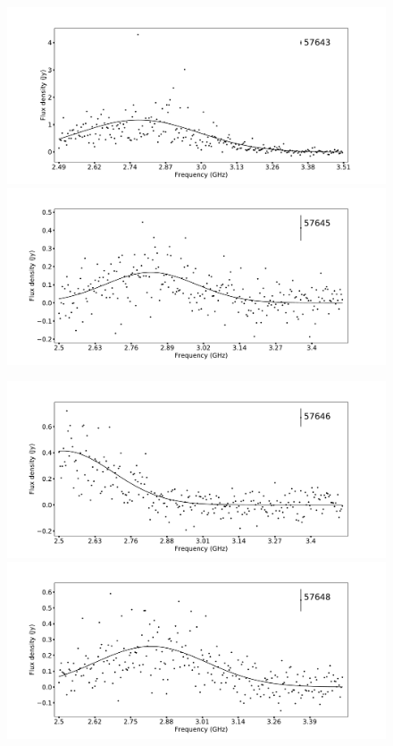 \documentclass[twocolumn]{aastex61}
\begin{document}
\begin{figure}[ht]
\begin{center}
 \begin{minipage}{2\columnwidth}
  \includegraphics[width=0.5\columnwidth]{spec_57643.pdf}
  \includegraphics[width=0.5\columnwidth]{spec_57645.pdf}
 \end{minipage}

 \begin{minipage}{2\columnwidth}
  \includegraphics[width=0.5\columnwidth]{spec_57646.pdf}
  \includegraphics[width=0.5\columnwidth]{spec_57648.pdf}
 \end{minipage}


\end{center}
\end{figure}
\end{document}
